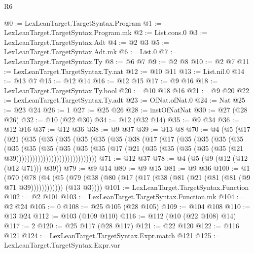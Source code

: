 \begin{lexlean}{R6}
\begin{coremodule}
@0 := LexLeanTarget.TargetSyntax.Program
@1 := LexLeanTarget.TargetSyntax.Program.mk
@2 := List.cons.{0}
@3 := LexLeanTarget.TargetSyntax.Adt
@4 := @2 @3
@5 := LexLeanTarget.TargetSyntax.Adt.mk
@6 := List.{0}
@7 := LexLeanTarget.TargetSyntax.Ty
@8 := @6 @7
@9 := @2 @8
@10 := @2 @7
@11 := LexLeanTarget.TargetSyntax.Ty.nat
@12 := @10 @11
@13 := List.nil.{0}
@14 := @13 @7
@15 := @12 @14
@16 := @12 @15
@17 := @9 @16
@18 := LexLeanTarget.TargetSyntax.Ty.bool
@20 := @10 @18 @16
@21 := @9 @20
@22 := LexLeanTarget.TargetSyntax.Ty.adt
@23 := OfNat.ofNat.{0}
@24 := Nat
@25 := @23 @24
@26 := 1
@27 := @25 @26
@28 := instOfNatNat
@30 := @27 (@28 @26)
@32 := @10 (@22 @30)
@34 := @12 (@32 @14)
@35 := @9 @34
@36 := @12 @16
@37 := @12 @36
@38 := @9 @37
@39 := @13 @8
@70 := @4
    (@5
      (@17
        (@21
          (@35
            (@35
              (@35
                (@35
                  (@35
                    (@35
                      (@38
                        (@17
                          (@17
                            (@35
                              (@35
                                (@35
                                  (@35
                                    (@35
                                      (@35
                                        (@35
                                          (@35
                                            (@35
                                              (@35
                                                (@17
                                                  (@21
                                                    (@35
                                                      (@35
                                                        (@35
                                                          (@35
                                                            (@35
                                                              (@21 @39))))))))))))))))))))))))))))))
@71 := @12 @37
@78 := @4 (@5 (@9 (@12 (@12 (@12 @71))) @39))
@79 := @9 @14
@80 := @9 @15
@81 := @9 @36
@100 := @1
    (@70
      (@78
        (@4
          (@5 (@79 (@38 (@80 (@17 (@17 (@38 (@81 (@21 (@81 (@81 (@9 @71 @39))))))))))))
          (@13 @3))))
@101 := LexLeanTarget.TargetSyntax.Function
@102 := @2 @101
@103 := LexLeanTarget.TargetSyntax.Function.mk
@104 := @2 @24
@105 := 0
@108 := @25 @105 (@28 @105)
@109 := @104 @108
@110 := @13 @24
@112 := @103 (@109 @110)
@116 := @112 (@10 (@22 @108) @14)
@117 := 2
@120 := @25 @117 (@28 @117)
@121 := @22 @120
@122 := @116 @121
@124 := LexLeanTarget.TargetSyntax.Expr.match @121
@125 := LexLeanTarget.TargetSyntax.Expr.var

\end{coremodule}
\end{lexlean}
